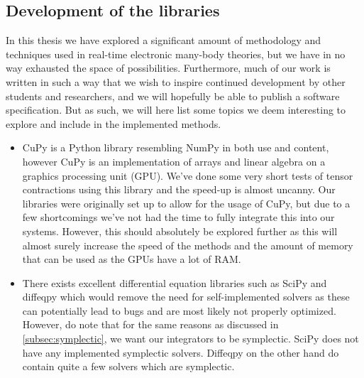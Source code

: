         \subsection{Development of the libraries}
            In this thesis we have explored a significant amount of methodology
            and techniques used in real-time electronic many-body theories, but
            we have in no way exhausted the space of possibilities.
            Furthermore, much of our work is written in such a way that we wish
            to inspire continued development by other students and researchers,
            and we will hopefully be able to publish a software specification.
            But as such, we will here list some topics we deem interesting to
            explore and include in the implemented methods.
            \begin{itemize}
                \item CuPy \cite{cupy} is a Python library resembling NumPy
                    \cite{numpy} in both use and content, however CuPy is an
                    implementation of arrays and linear algebra on a graphics
                    processing unit (GPU).  We've done some very short tests of
                    tensor contractions using this library and the speed-up is
                    almost uncanny.  Our libraries were originally set up to
                    allow for the usage of CuPy, but due to a few shortcomings
                    we've not had the time to fully integrate this into our
                    systems.  However, this should absolutely be explored
                    further as this will almost surely increase the speed of the
                    methods and the amount of memory that can be used as the
                    GPUs have a lot of RAM.
                \item There exists excellent differential equation libraries
                    such as SciPy \cite{scipy} and diffeqpy \cite{julia-diff}
                    which would remove the need for self-implemented solvers as
                    these can potentially lead to bugs and are most likely not
                    properly optimized.
                    However, do note that for the same reasons as discussed in
                    \autoref{subsec:symplectic}, we want our integrators to be
                    symplectic.
                    SciPy does not have any implemented symplectic solvers.
                    Diffeqpy on the other hand do contain quite a few solvers
                    which are symplectic.

\end{itemize}
